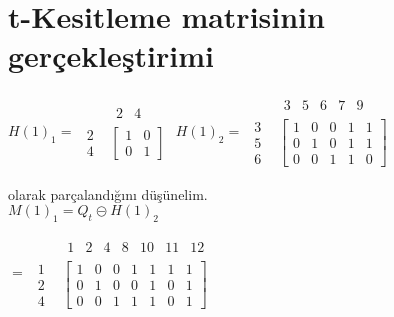 \documentclass[11pt]{amsbook}
\begin{document}

\section{t-Kesitleme matrisinin gerçekleştirimi}

\begin{center}

$
H(1)_{1} =\begin{array}{cc}
	& \begin{array}{cc}
		2 & 4
	\end{array} \\
	\begin{array}{c}
		2 \\ 4
	\end{array} &
	\left[ \begin{array}{cc}
		1 & 0 \\ 0 & 1
	\end{array} \right]
\end{array}
$
\quad 
$ 
H(1)_{2} =
\begin{array}{ccccc}
& \begin{array}{ccccc}
3& 5 & 6 & 7 & 9 
\end{array} \\
\begin{array}{c}
3 \\ 5 \\ 6
\end{array} &
\left[ \begin{array}{ccccc}
1 & 0 &  0 & 1 & 1\\
0 & 1 &  0 & 1 & 1\\
0 & 0 &  1 & 1 & 0

\end{array} \right]
\end{array}$
\end{center}


olarak parçalandığını düşünelim.
\\

$M(1)_{1} = Q_{t} \circleddash  H(1)_{2}$


\begin{center}
$
=
\begin{array}{ccccccc}
& \begin{array}{ccccccc}
1& 2 & 4 & 8 & 10 & 11 & 12 
\end{array} \\
\begin{array}{c}
1 \\ 2 \\ 4
\end{array} &
\left[ \begin{array}{ccccccc}
1 & 0 &  0 & 1 & 1 & 1 & 1\\
0 & 1 &  0 & 0 & 1 & 0 & 1\\
0 & 0 &  1 & 1 & 1 & 0 & 1

\end{array} \right]
\end{array}$
\end{center}
\end{document}
